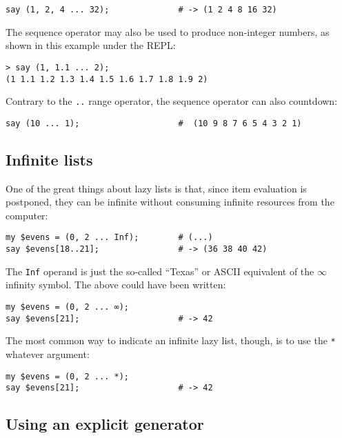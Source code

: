\begin{verbatim}
say (1, 2, 4 ... 32);              # -> (1 2 4 8 16 32)
\end{verbatim}

The sequence operator may also be used to produce non-integer 
numbers, as shown in this example under the REPL:

\begin{verbatim}
> say (1, 1.1 ... 2);
(1 1.1 1.2 1.3 1.4 1.5 1.6 1.7 1.8 1.9 2)
\end{verbatim}

Contrary to the \verb'..' range operator, the sequence 
operator can also countdown:

\begin{verbatim}
say (10 ... 1);                    #  (10 9 8 7 6 5 4 3 2 1)
\end{verbatim}

\subsection{Infinite lists}

One of the great things about lazy lists is that, since 
item evaluation is postponed, they can be infinite without 
consuming infinite resources from the computer:

\begin{verbatim}
my $evens = (0, 2 ... Inf);        # (...)
say $evens[18..21];                # -> (36 38 40 42)
\end{verbatim}

The {\tt Inf} operand is just the so-called ``Texas'' 
or ASCII equivalent of the $\infty$ infinity symbol. 
The above could have been written:

\begin{verbatim}
my $evens = (0, 2 ... ∞); 
say $evens[21];                    # -> 42
\end{verbatim} 

The most common way to indicate an infinite lazy list, though, 
is to use the \verb'*' whatever argument:

\begin{verbatim}
my $evens = (0, 2 ... *); 
say $evens[21];                    # -> 42
\end{verbatim} 

\subsection{Using an explicit generator}


